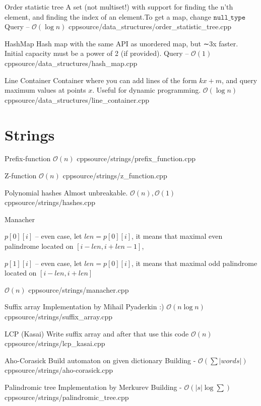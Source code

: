 \documentclass[landscape, 10pt, a4paper, oneside, twocolumn]{extarticle}
\begin{document}
\Algorithm
{Order statistic tree}
{A set (not multiset!) with support for finding the n'th element, and finding the index of an element.To get a map, change $\texttt{null\_type}$}
{Query – $\mathcal{O}(\log n)$}
{cpp}{source/data_structures/order_statistic_tree.cpp}

\Algorithm
{HashMap}
{Hash map with the same API as unordered map, but ∼3x faster. Initial capacity must be a power of 2 (if provided).}
{Query – $\mathcal{O}(1)$}
{cpp}{source/data_structures/hash_map.cpp}

\Algorithm
{Line Container}
{Container where you can add lines of the form $kx+m$, and query maximum values at points $x$. Useful for dynamic programming.}
{$\mathcal{O}(\log n)$}
{cpp}{source/data_structures/line_container.cpp}





\section{Strings}

\Algorithm
{Prefix-function}
{}
{$\mathcal{O}(n)$}
{cpp}{source/strings/prefix_function.cpp}

\Algorithm
{Z-function}
{}
{$\mathcal{O}(n)$}
{cpp}{source/strings/z_function.cpp}

\Algorithm
{Polynomial hashes}
{Almost unbreakable.}
{$\mathcal{O}(n), \mathcal{O}(1)$}
{cpp}{source/strings/hashes.cpp}

\Algorithm
{Manacher}
{$p[0][i]$ – even case, let $len = p[0][i]$,
it means that maximal even palindrome located on $[i - len, i + len - 1]$,

$p[1][i]$ – even case, let $len = p[0][i]$,
it means that maximal odd palindrome located on $[i - len, i + len]$
}
{$\mathcal{O}(n)$}
{cpp}{source/strings/manacher.cpp}

\Algorithm
{Suffix array}
{Implementation by Mihail Pyaderkin :)}
{$\mathcal{O}(n \log n)$}
{cpp}{source/strings/suffix_array.cpp}

\Algorithm
{LCP (Kasai)}
{Write suffix array and after that use this code}
{$\mathcal{O}(n)$}
{cpp}{source/strings/lcp_kasai.cpp}

\Algorithm
{Aho-Corasick}
{Build automaton on given dictionary}
{Building - $\mathcal{O}(\sum|words|)$}
{cpp}{source/strings/aho-corasick.cpp}


\Algorithm
{Palindromic tree}
{Implementation by Merkurev}
{Building - $\mathcal{O}(|s| \log \sum)$}
{cpp}{source/strings/palindromic_tree.cpp}
\end{document}
